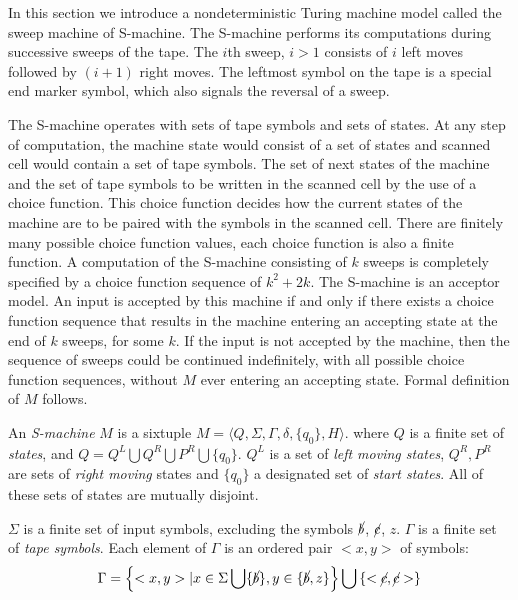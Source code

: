 In this section we introduce a nondeterministic Turing machine model called the sweep machine of S-machine.
The S-machine performs its computations during successive sweeps of the tape.
The $i$th sweep, $i > 1$ consists of $i$ left moves followed by $(i+1)$ right moves.
The leftmost symbol on the tape is a special end marker symbol, which also signals the reversal of a sweep.

The S-machine operates with sets of tape symbols and sets of states.
At any step of computation, the machine state would consist of a set of states and scanned cell
would contain a set of tape symbols.
The set of next states of the machine and the set of tape symbols to be written in the scanned
cell by the use of a choice function.
This choice function decides how the current states of the machine are to be
paired with the symbols in the scanned cell.
There are finitely many possible choice function values, each choice function is also a finite function.
A computation of the S-machine consisting of $k$ sweeps is completely specified by a choice
function sequence of $k^2 + 2k$.
The S-machine is an acceptor model.
An input is accepted by this machine if and only if there exists a choice function sequence that
results in the machine entering an accepting state at the end of $k$ sweeps, for some
$k$.
If the input is not accepted by the machine, then the sequence of sweeps could
be continued indefinitely, with all possible choice function sequences, without $M$ 
ever entering an accepting state.
Formal definition of $M$ follows.

An \emph{S-machine} $M$ is a sixtuple 
$M = \langle Q, \Sigma, \Gamma, \delta, \{q_0\}, H \rangle$.
where $Q$ is a finite set of \emph{states}, and 
$Q = Q^L \bigcup Q^R \bigcup P^R \bigcup \{q_0\}$.
$Q^L$ is a set of \emph{left moving states}, $Q^R, P^R$ are 
sets of \emph{right moving} states and $\{q_0\}$ a designated 
set of \emph{start states}.
All of these sets of states are mutually disjoint.


$\Sigma$ is a finite set of input symbols, excluding the symbols $\cancel{b}$, $\cancel{c}$, $z$.
$\Gamma$ is a finite set of \emph{tape symbols}.
Each element of $\Gamma$ is an ordered pair
$<x,y>$ of symbols:
\begin{equation*}
    \Gamma = \left\{ <x,y> | x \in \Sigma \bigcup \{\cancel{b}\},
    y \in \{\cancel{b}, z\}\right\} \bigcup \left\{<\cancel{c}, \cancel{c}>\right\}
\end{equation*}


